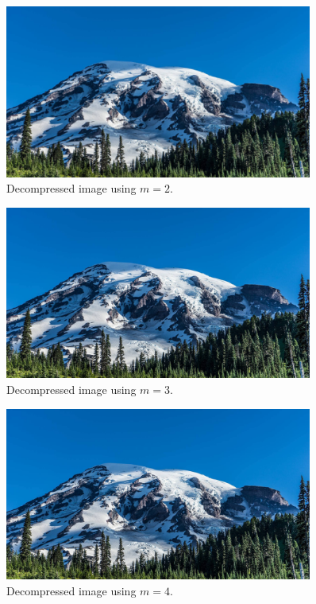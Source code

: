 \begin{figure}[h]
    \centering
    \includegraphics[width=0.9\textwidth]{../Decompressed Images/decompressedImage_m2.png}
    \caption{Decompressed image using $m=2$.}
    \label{fig:decompressed_img_m2}
\end{figure}

\begin{figure}[h]
    \centering
    \includegraphics[width=0.9\textwidth]{../Decompressed Images/decompressedImage_m3.png}
    \caption{Decompressed image using $m=3$.}
    \label{fig:decompressed_img_m3}
\end{figure}

\begin{figure}[h]
    \centering
    \includegraphics[width=0.9\textwidth]{../Decompressed Images/decompressedImage_m4.png}
    \caption{Decompressed image using $m=4$.}
    \label{fig:decompressed_img_m4}
\end{figure}

